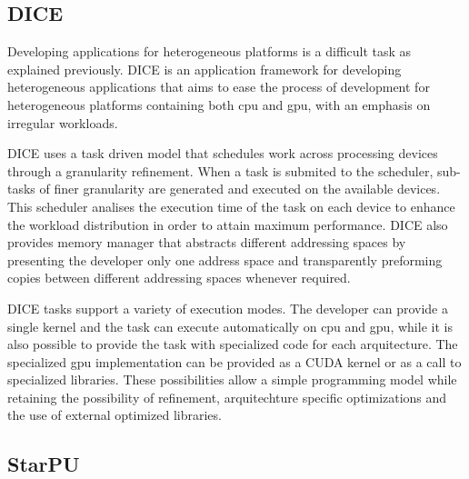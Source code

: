 \subsection{DICE}

Developing applications for heterogeneous platforms is a difficult task as explained previously. DICE \citep{Barbosa} is an application framework for developing heterogeneous applications that aims to ease the process of development for heterogeneous platforms containing both \gls{cpu} and \gls{gpu}, with an emphasis on irregular workloads.


DICE uses a task driven model that schedules work across processing devices through a granularity refinement. When a task is submited to the scheduler, sub-tasks of finer granularity are generated and executed on the available devices. This scheduler analises the execution time of the task on each device to enhance the workload distribution in order to attain maximum performance. DICE also provides memory manager that abstracts different addressing spaces by presenting the developer only one address space and transparently preforming copies between different addressing spaces whenever required.

DICE tasks support a variety of execution modes. The developer can provide a single kernel and the task can execute automatically on \gls{cpu} and \gls{gpu}, while it is also possible to provide the task with specialized code for each arquitecture. The specialized \gls{gpu} implementation can be provided as a CUDA kernel or as a call to specialized libraries. These possibilities allow a simple programming model while retaining the possibility of refinement, arquitechture specific optimizations and the use of external optimized libraries.

\subsection{StarPU}


